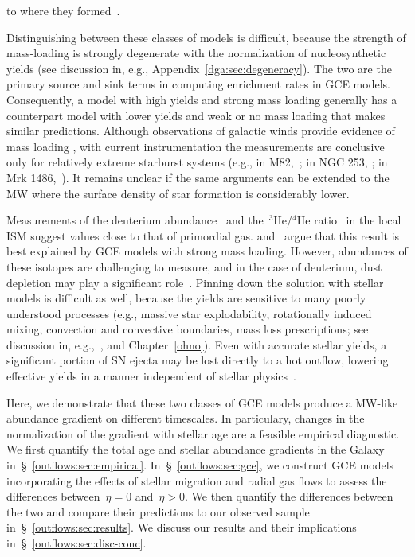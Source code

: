 to where they formed~\citep{Melioli2008, Melioli2009, Spitoni2008, Spitoni2009}.
\par
Distinguishing between these classes of models is difficult, because the
strength of mass-loading is strongly degenerate with the normalization of
nucleosynthetic yields (see discussion in, e.g.,
Appendix~\ref{dga:sec:degeneracy}).
The two are the primary source and sink terms in computing enrichment rates in
GCE models.
Consequently, a model with high yields and strong mass loading generally
has a counterpart model with lower yields and weak or no mass loading that
makes similar predictions.
Although observations of galactic winds provide evidence of mass loading
\citep[see, e.g., the review by][]{Veilleux2020}, with current
instrumentation the measurements are conclusive only for relatively extreme
starburst systems (e.g., in M82,~\citealt{Lopez2020}; in NGC 253,
\citealt{Lopez2023}; in Mrk 1486,~\citealt{Cameron2021}).
It remains unclear if the same arguments can be extended to the MW where the
surface density of star formation is considerably lower.
\par
Measurements of the deuterium abundance~\citep{Linsky2006, Prodanovic2010} and
the~$^3$He/$^4$He ratio~\citep{Balser2018} in the local ISM suggest values
close to that of primordial gas.
\citet{Weinberg2017a} and~\citet{Cooke2022} argue that this result is best
explained by GCE models with strong mass loading.
However, abundances of these isotopes are challenging to measure, and in the
case of deuterium, dust depletion may play a significant
role~\citep{Romano2006}.
Pinning down the solution with stellar models is difficult as well, because the
yields are sensitive to many poorly understood processes (e.g., massive star
explodability, rotationally induced mixing, convection and convective
boundaries, mass loss prescriptions; see discussion in,
e.g.,~\citealt{Romano2010, Griffith2021b, Gil-Pons2022}, and
Chapter~\ref{ohno}).
Even with accurate stellar yields, a significant portion of SN ejecta may be
lost directly to a hot outflow, lowering effective yields in a manner
independent of stellar physics~\citep{Dalcanton2007, Peeples2011,
Christensen2018, Chisholm2018, Cameron2021}.
\par
Here, we demonstrate that these two classes of GCE models produce a MW-like
abundance gradient on different timescales.
In particulary, changes in the normalization of the gradient with stellar age
are a feasible empirical diagnostic.
We first quantify the total age and stellar abundance gradients in the Galaxy
in~\S~\ref{outflows:sec:empirical}.
In~\S~\ref{outflows:sec:gce}, we construct GCE models incorporating the effects
of stellar migration and radial gas flows to assess the differences
between~$\eta = 0$ and~$\eta > 0$.
We then quantify the differences between the two and compare their predictions
to our observed sample in~\S~\ref{outflows:sec:results}.
We discuss our results and their implications
in~\S~\ref{outflows:sec:disc-conc}.

